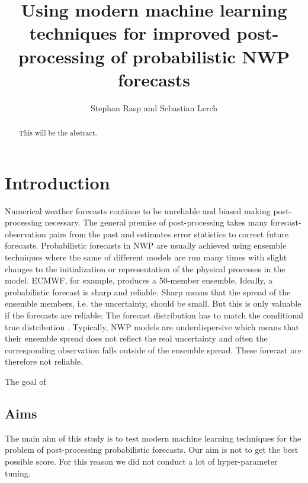 \documentclass[a4paper,10pt]{scrartcl}
\title{Using modern machine learning techniques for improved post-processing of probabilistic NWP forecasts}
\author{Stephan Rasp and Sebastian Lerch}
\begin{document}
\maketitle

\begin{abstract}
This will be the abstract.
\end{abstract}

\section{Introduction}
Numerical weather forecasts continue to be unreliable and biased \citep{Hemri2014} making post-processing necessary. The general premise of post-processing takes many forecast-observation pairs from the past and estimates error statistics to correct future forecasts. Probabilistic forecasts in NWP are usually achieved using ensemble techniques where the same of different models are run many times with slight changes to the initialization or representation of the physical processes in the model. ECMWF, for example, produces a 50-member ensemble. Ideally, a probabilistic forecast is sharp and reliable. Sharp means that the spread of the ensemble members, i.e. the uncertainty, should be small. But this is only valuable if the forecasts are reliable: The forecast distribution has to match the conditional true distribution \citep{Gneiting2005}. Typically, NWP models are underdispersive which means that their ensemble spread does not reflect the real uncertainty and often the corresponding observation falls outside of the ensemble spread. These forecast are therefore not reliable. 

The goal of 

\subsection{Aims}
The main aim of this study is to test modern machine learning techniques for the problem of post-processing probabilistic forecasts. Our aim is not to get the best possible score. For this reason we did not conduct a lot of hyper-parameter tuning. 
\end{document}
